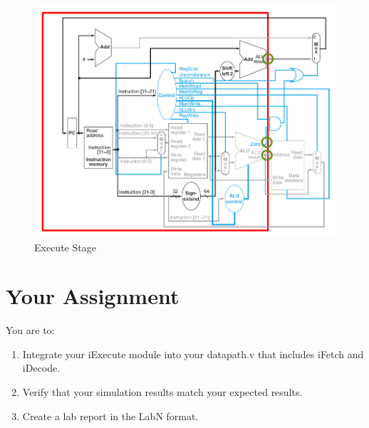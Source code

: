 \begin{figure}
	\caption{Execute Stage}\label{fig:integrated_execute}
	\begin{center}
		\includegraphics[width=4.75in]{../images/integrated_execute.png}
	\end{center}
\end{figure} 

\section{Your Assignment}

You are to:
\begin{enumerate}
\item Integrate your iExecute module into your datapath.v that includes iFetch and iDecode.
\item Verify that your simulation results match your expected results.
\item Create a lab report in the LabN format.
\end{enumerate}